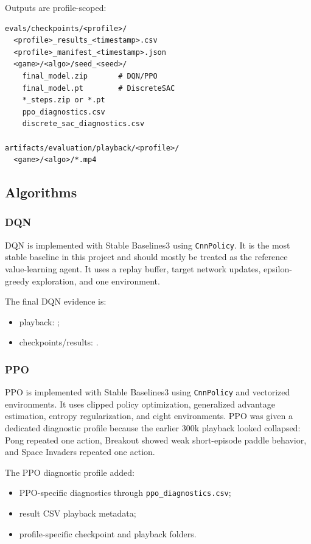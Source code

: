 \documentclass[11pt]{article}
\begin{document}
Outputs are profile-scoped:

\begin{verbatim}
evals/checkpoints/<profile>/
  <profile>_results_<timestamp>.csv
  <profile>_manifest_<timestamp>.json
  <game>/<algo>/seed_<seed>/
    final_model.zip       # DQN/PPO
    final_model.pt        # DiscreteSAC
    *_steps.zip or *.pt
    ppo_diagnostics.csv
    discrete_sac_diagnostics.csv

artifacts/evaluation/playback/<profile>/
  <game>/<algo>/*.mp4
\end{verbatim}

\subsection*{Algorithms}

\subsubsection*{DQN}

DQN is implemented with Stable Baselines3 using \texttt{CnnPolicy}. It is the most stable baseline in this project and should mostly be treated as the reference value-learning agent. It uses a replay buffer, target network updates, epsilon-greedy exploration, and one environment.

The final DQN evidence is:

\begin{itemize}
\item playback: ;
\item checkpoints/results: .
\end{itemize}

\subsubsection*{PPO}

PPO is implemented with Stable Baselines3 using \texttt{CnnPolicy} and vectorized environments. It uses clipped policy optimization, generalized advantage estimation, entropy regularization, and eight environments. PPO was given a dedicated diagnostic profile because the earlier 300k playback looked collapsed: Pong repeated one action, Breakout showed weak short-episode paddle behavior, and Space Invaders repeated one action.

The PPO diagnostic profile added:

\begin{itemize}
\item PPO-specific diagnostics through \texttt{ppo\_diagnostics.csv};
\item result CSV playback metadata;
\item profile-specific checkpoint and playback folders.
\end{itemize}
\end{document}
